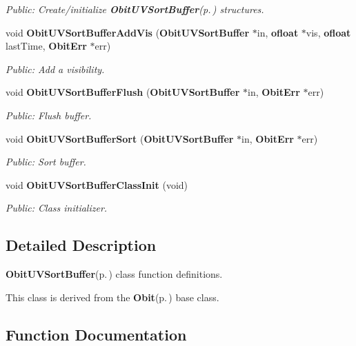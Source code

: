 \begin{CompactItemize}
\begin{CompactList}\small\item\em Public: Create/initialize {\bf Obit\-UVSort\-Buffer}{\rm (p.\,\pageref{structObitUVSortBuffer})} structures. \item\end{CompactList}\item 
void {\bf Obit\-UVSort\-Buffer\-Add\-Vis} ({\bf Obit\-UVSort\-Buffer} $\ast$in, {\bf ofloat} $\ast$vis, {\bf ofloat} last\-Time, {\bf Obit\-Err} $\ast$err)
\begin{CompactList}\small\item\em Public: Add a visibility. \item\end{CompactList}\item 
void {\bf Obit\-UVSort\-Buffer\-Flush} ({\bf Obit\-UVSort\-Buffer} $\ast$in, {\bf Obit\-Err} $\ast$err)
\begin{CompactList}\small\item\em Public: Flush buffer. \item\end{CompactList}\item 
void {\bf Obit\-UVSort\-Buffer\-Sort} ({\bf Obit\-UVSort\-Buffer} $\ast$in, {\bf Obit\-Err} $\ast$err)
\begin{CompactList}\small\item\em Public: Sort buffer. \item\end{CompactList}\item 
void {\bf Obit\-UVSort\-Buffer\-Class\-Init} (void)
\begin{CompactList}\small\item\em Public: Class initializer. \item\end{CompactList}\end{CompactItemize}


\subsection{Detailed Description}
{\bf Obit\-UVSort\-Buffer}{\rm (p.\,\pageref{structObitUVSortBuffer})} class function definitions. 

This class is derived from the {\bf Obit}{\rm (p.\,\pageref{structObit})} base class.

\subsection{Function Documentation}
